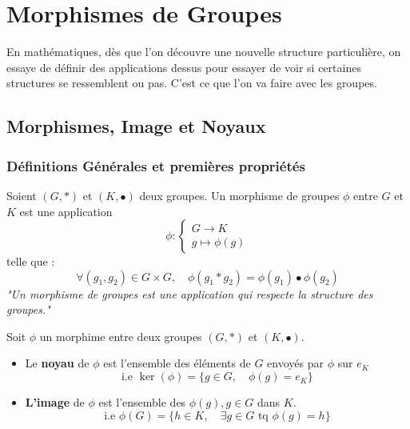 \chapter{Morphismes de Groupes}

\setlength{\parindent}{0pt}
\renewcommand{\labelitemi}{\textbullet} %


En mathématiques, dès que l'on découvre une nouvelle structure particulière, on essaye de définir des applications dessus 
pour essayer de voir si certaines structures se ressemblent ou pas. C'est ce que l'on va faire avec les groupes. 


\section{Morphismes, Image et Noyaux}

\subsection{Définitions Générales et premières propriétés}

\begin{definition}
    Soient $(G,\ast )$ et $(K,\bullet )$ deux groupes. 
    Un morphisme de groupes $\phi$ entre $G$ et $K$ est une application 
        \[ \phi : 
        \begin{cases}
            G \longrightarrow K \\ 
            g \longmapsto \phi(g)
        \end{cases} \] 
        telle que : 
        \[ \forall (g_1,g_2) \in G \times G, \quad \phi (g_1 \ast g_2) = \phi(g_1) \bullet \phi(g_2) \]
    \emph{"Un morphisme de groupes est une application qui respecte la structure des groupes."}
\end{definition}

\begin{definition}
    Soit $\phi$ un morphime entre deux groupes $(G,*)$ et $(K,\bullet)$. 
    \begin{itemize}
        \item Le \textbf{noyau} de $\phi$ est l'ensemble des éléments de $G$ envoyés par $\phi$ sur $e_{K}$ 
            \[ \text{i.e } \ker (\phi) = \{ g \in G, \quad  \phi(g) = e_{K} \} \] 
        \item \textbf{L'image} de $\phi$ est l'ensemble des $\phi(g), g \in G$ dans $K$. 
            \[ \text{i.e }  \phi(G) = \{ h \in K, \quad \exists g \in G \text{ tq } \phi(g) = h \} \] 
    \end{itemize}
\end{definition}

